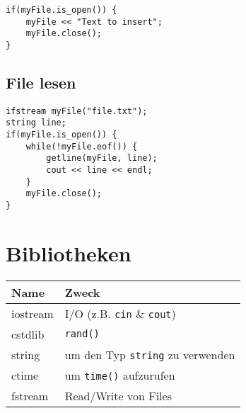 \documentclass{article}
\newenvironment{code}
	{\begin{shaded}\vspace{-2.2mm}} 
	{\vspace{-5.0mm}\end{shaded}}
\begin{document}
\begin{multicols*}{3}
\begin{code}
\begin{lstlisting}[style=list]
if(myFile.is_open()) {
	myFile << "Text to insert";
	myFile.close();
}
					\end{lstlisting}
				\end{code}
			
			\subsection{File lesen} %
				\begin{code}
					\begin{lstlisting}[style=list]
ifstream myFile("file.txt");
string line;
if(myFile.is_open()) {
	while(!myFile.eof()) {
		getline(myFile, line);
		cout << line << endl;
	}
	myFile.close();
}
					\end{lstlisting}
				\end{code}
	
	\section{Bibliotheken} %
		\begin{tabular}{l|l}
		\hline
		Name & Zweck\\
		\hline
		iostream & I/O (z.B. \lstinline!cin! \& \lstinline!cout!)\\
		cstdlib & \lstinline!rand()!\\
		string & um den Typ \lstinline!string! zu verwenden \\
		ctime & um \lstinline!time()! aufzurufen \\
		fstream & Read/Write von Files \\
		\hline
		\end{tabular}
		
	
\end{multicols*}
\end{document}
